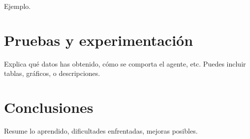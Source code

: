\documentclass[conference]{IEEEtran}
\begin{document}
Ejemplo.

\section{Pruebas y experimentación}
Explica qué datos has obtenido, cómo se comporta el agente, etc. Puedes incluir tablas, gráficos, o descripciones.

\section{Conclusiones}
Resume lo aprendido, dificultades enfrentadas, mejoras posibles.




\end{document}
